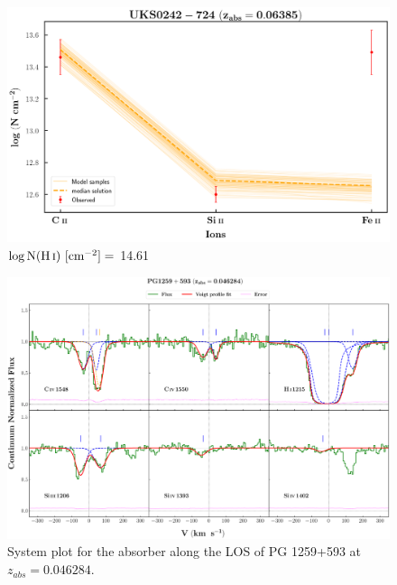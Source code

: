   
  \begin{figure}[!h]
    \centering
    \includegraphics[width=0.9\linewidth]{Ionisation-Modelling-Plots/uks0242-z=0.06385-compI_logZ=1.png}
    \caption{$\log \text{N}(\ion{H}{i}) \ [\text{cm}^{-2}]=$ 14.61}
  \end{figure}
  
  \restoregeometry
  
  \newpage
  \thispagestyle{empty}

  \begin{landscape}
  
  \begin{figure}
      \centering
      \vspace{-10mm}
      \hspace*{-20mm}
      \includegraphics[width=1.1\linewidth]{System-Plots/PG1259+593_z=0.046284_sys_plot.png}
      \caption{System plot for the absorber along the LOS of PG 1259+593 at $z_{abs} = 0.046284$. }
  \end{figure}
  
  \end{landscape}
  
